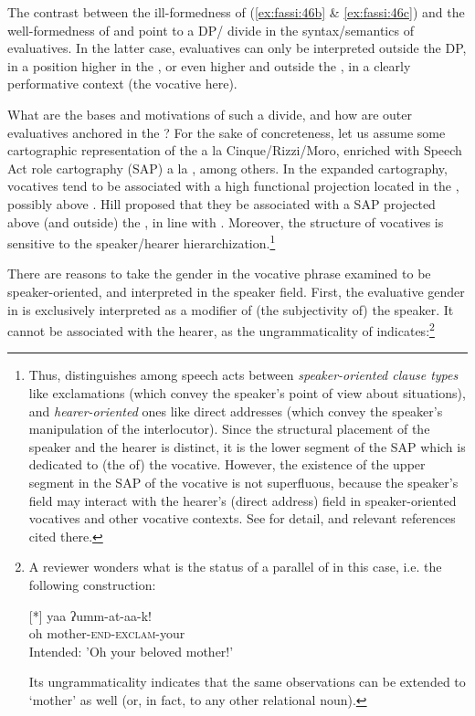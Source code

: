 The contrast between the ill-formed\-ness of (\ref{ex:fassi:46b} \&
\ref{ex:fassi:46c}) and the well-formed\-ness of  and
 point to a DP/ divide in the syntax/semantics of
evaluatives. In the latter case, evaluatives can only be interpreted outside
the DP, in a position higher in the , or even higher and outside the , in a
clearly performative context (the vocative here).

What are the bases and motivations of such a divide, and how are outer
evaluatives anchored in the ? For the sake of concreteness, let us assume
some cartographic representation of the  a la Cinque/Rizzi/Moro, enriched
with Speech Act role cartography (SAP) a la \citet{Hill2014}, among others. In
the expanded  cartography, vocatives tend to be associated with a high
functional projection located in the , possibly above  \citep[as
in][]{Moro2003}. Hill proposed that they be associated with a SAP projected
above (and outside) the , in line with \citet{SpeasEtAl2003}. Moreover, the
structure of vocatives is sensitive to the speaker/hearer
hierarchization.\footnote{Thus, \citet[207]{Hill2014} distinguishes among
speech acts between \textit{speaker-oriented clause types} like exclamations
(which convey the speaker's point of view about situations), and \textit
{hearer-oriented} ones like direct addresses (which convey the speaker's
manipulation of the interlocutor). Since the structural placement of the
speaker and the hearer is distinct, it is the lower segment of the SAP which is
dedicated to (the  of) the vocative. However, the existence of the upper
segment in the SAP of the vocative is not superfluous, because the speaker's
field may interact with the hearer's (direct address) field in speaker-oriented
vocatives and other vocative contexts. See \citet{Hill2014} for detail, and
relevant references cited there.}

There are reasons to take the gender in the vocative phrase examined to be
speaker-oriented, and interpreted in the speaker field. First, the evaluative
gender in  is exclusively interpreted as a modifier of (the
subjectivity of) the speaker. It cannot be associated with the hearer, as the
ungrammaticality of  indicates:\footnote{A reviewer wonders
what is the status of a parallel of  in this case, i.e. the
following construction:

\begin{exe}
  [*]{
    \gll yaa ʔumm-at-aa-k!\\
    oh mother-\textsc{end-exclam}-your\\
    \glt Intended: 'Oh your beloved mother!'\\
  }
\end{exe}

Its ungrammaticality indicates that the same observations can be extended to
`mother' as well (or, in fact, to any other relational noun).}

